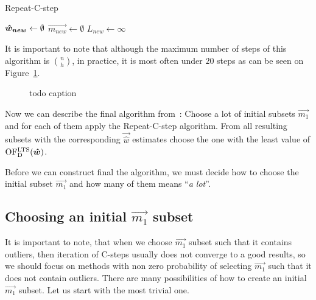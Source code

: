 \begin{algorithm}[H]
    \label{alg:RepeatCstep}
    \caption{Repeat-C-step}
    $\boldsymbol{\hat{w}_{new}} \gets \emptyset$\;
    $\vec{m_{new}} \gets \emptyset$\;
    $L_{new} \gets \infty $\;


    \;
\end{algorithm}

It is important to note that although the maximum number of steps of this algorithm is ${n \choose h}$, in practice, it is most often under $20$ steps as can be seen on Figure~\ref{figure:repeat:c:steps:cnt:converge}.

\begin{figure}[h]
\centering
{}
\caption{todo caption}
\label{figure:repeat:c:steps:cnt:converge}
\end{figure}

Now we can describe the final algorithm from~\cite{rouss:2000}: Choose a lot of initial subsets $\vec{m_1}$ and for each of them apply the Repeat-C-step algorithm. From all resulting subsets with the corresponding $\vec{\hat{w}}$ estimates choose the one with the least value of $\operatorname{OF^{LTS}_D}(\boldsymbol{\hat{w}})$. 

Before we can construct final the algorithm, we must decide how to choose the initial subset $\vec{m_1}$ and how many of them means ``\emph{a lot}''.




\subsection{Choosing an initial $\vec{m_1}$ subset}

It is important to note, that when we choose $\vec{m_1}$ subset such that it contains outliers, then iteration of  C-steps usually does not converge to a good results, so we should focus on methods with non zero probability of selecting $\vec{m_1}$ such that it does not contain outliers.
There are many possibilities of how to create an initial $\vec{m_1}$ subset. Let us start with the most trivial one.


